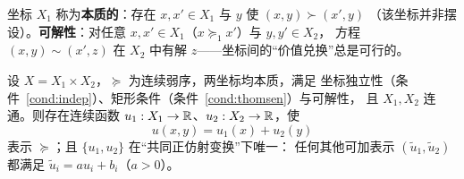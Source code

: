 \begin{definition}[本质坐标与可解性]\label{def:essential}
坐标 $X_1$ 称为\textbf{本质的}：存在 $x,x'\in X_1$ 与 $y$ 使 $(x,y)\succ(x',y)$
（该坐标并非摆设）。\textbf{可解性}：对任意 $x,x'\in X_1$（$x\succeq_1 x'$）与 $y,y'\in X_2$，
方程 $(x,y)\sim(x',z)$ 在 $X_2$ 中有解 $z$——坐标间的“价值兑换”总是可行的。
\end{definition}

\begin{theorem}[两因子可加表示定理]\label{thm:additive}
设 $X=X_1\times X_2$，$\succeq$ 为连续弱序，两坐标均本质，满足
坐标独立性（条件~\ref{cond:indep}）、矩形条件（条件~\ref{cond:thomsen}）与可解性，
且 $X_1,X_2$ 连通。则存在连续函数 $u_1:X_1\to\mathbb{R}$、$u_2:X_2\to\mathbb{R}$，使
\[
u(x,y)=u_1(x)+u_2(y)
\]
表示 $\succeq$；且 $\{u_1,u_2\}$ 在“共同正仿射变换”下唯一：
任何其他可加表示 $(\tilde u_1,\tilde u_2)$ 都满足
$\tilde u_i=a u_i+b_i$（$a>0$）。
\end{theorem}

